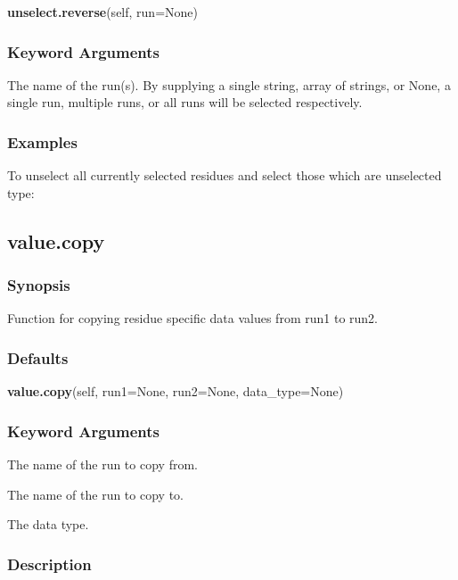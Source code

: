 \textsf{\textbf{unselect.reverse}(self, run=None)}


\subsubsection{Keyword Arguments}


  The name of the run(s).  By supplying a single string, array of strings, or None, a single run, multiple runs, or all runs will be selected respectively.

\subsubsection{Examples}

To unselect all currently selected residues and select those which are unselected type:




\newpage

\subsection{value.copy}


\subsubsection{Synopsis}

Function for copying residue specific data values from run1 to run2.

\subsubsection{Defaults}

\textsf{\textbf{value.copy}(self, run1=None, run2=None, data\_type=None)}


\subsubsection{Keyword Arguments}


  The name of the run to copy from.

  The name of the run to copy to.

  The data type.

\subsubsection{Description}

